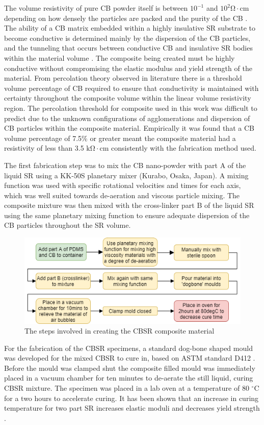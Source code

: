 The volume resistivity of pure CB powder itself is between $10^{-1}$ and $10^2 \mathrm{\Omega \cdot cm}$ depending on how densely the particles are packed and the purity of the CB \cite{Spahr2017}. The ability of a CB matrix embedded within a highly insulative SR substrate to become conductive is determined mainly by the dispersion of the CB particles, and the tunneling that occurs between conductive CB and insulative SR bodies within the material volume \cite{Spahr2017,Wang2013}. The composite being created must be highly conductive without compromising the elastic modulus and yield strength of the material. From percolation theory observed in literature \cite{Spahr2017} there is a threshold volume percentage of CB required to ensure that conductivity is maintained with certainty throughout the composite volume within the linear volume resistivity region. The percolation threshold for composite used in this work was difficult to predict due to the unknown configurations of agglomerations and dispersion of CB particles within the composite material. Empirically it was found that a CB volume percentage of 7.5\% or greater meant the composite material had a resistivity of less than 3.5 $\mathrm{k\Omega \cdot cm}$ consistently with the fabrication method used.

The first fabrication step was to mix the CB nano-powder with part A of the liquid SR using a KK-50S planetary mixer (Kurabo, Osaka, Japan). A mixing function was used with specific rotational velocities and times for each axis, which was well suited towards de-aeration and viscous particle mixing. The composite mixture was then mixed with the cross-linker part B of the liquid SR using the same planetary mixing function to ensure adequate dispersion of the CB particles throughout the SR volume.
\begin{figure}[H]
	\centering
	\includegraphics[width=0.8\linewidth]{Figures/specimenPrepFlowDiagram (1).png}
	\caption{The steps involved in creating the CBSR composite material}
	\label{fig:CBSR_flow_diagram}
\end{figure}
For the fabrication of the CBSR specimens, a standard dog-bone shaped mould was developed for the mixed CBSR to cure in, based on ASTM standard D412 \cite{ASTM2020}. Before the mould was clamped shut the composite filled mould was immediately placed in a vacuum chamber for ten minutes to de-aerate the still liquid, curing CBSR mixture. The specimen was placed in a lab oven at a temperature of 80 $^{\circ}$C for a two hours to accelerate curing. It has been shown that an increase in curing temperature for two part SR increases elastic moduli and decreases yield strength \cite{Johnston2014, Wu2005}.


